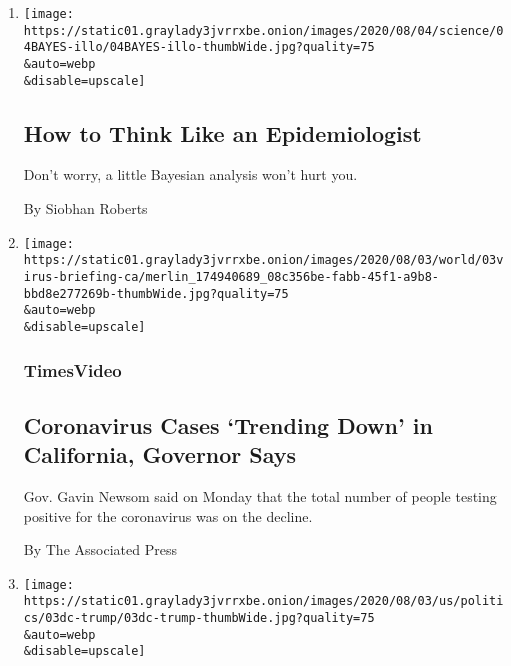 \begin{enumerate}
\def\labelenumi{\arabic{enumi}.}
\item
  \href{/2020/08/04/science/coronavirus-bayes-statistics-math.html}{}

  \texttt{[image: https://static01.graylady3jvrrxbe.onion/images/2020/08/04/science/04BAYES-illo/04BAYES-illo-thumbWide.jpg?quality=75\\\&auto=webp\\\&disable=upscale]}

  \hypertarget{how-to-think-like-an-epidemiologist}{%
  \subsection{How to Think Like an
  Epidemiologist}\label{how-to-think-like-an-epidemiologist}}

  Don't worry, a little Bayesian analysis won't hurt you.

  By Siobhan Roberts
\item
  \href{/video/us/100000007271181/california-virus-cases-trend-down.html}{}

  \texttt{[image: https://static01.graylady3jvrrxbe.onion/images/2020/08/03/world/03virus-briefing-ca/merlin\_174940689\_08c356be-fabb-45f1-a9b8-bbd8e277269b-thumbWide.jpg?quality=75\\\&auto=webp\\\&disable=upscale]}

  \hypertarget{timesvideo}{%
  \subsubsection{TimesVideo}\label{timesvideo}}

  \hypertarget{coronavirus-cases-trending-down-in-california-governor-says}{%
  \subsection{Coronavirus Cases `Trending Down' in California, Governor
  Says}\label{coronavirus-cases-trending-down-in-california-governor-says}}

  Gov. Gavin Newsom said on Monday that the total number of people
  testing positive for the coronavirus was on the decline.

  By The Associated Press
\item
  \href{/2020/08/03/us/politics/trump-mail-in-voting.html}{}

  \texttt{[image: https://static01.graylady3jvrrxbe.onion/images/2020/08/03/us/politics/03dc-trump/03dc-trump-thumbWide.jpg?quality=75\\\&auto=webp\\\&disable=upscale]}

  \hypertarget{trump-again-assails-mail-in-voting}{%
}
\end{enumerate}
